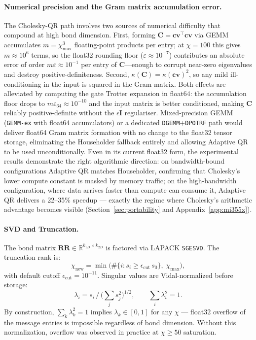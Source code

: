 \documentclass[11pt]{article}
\newcommand{\chimax}{\chi_{\mathrm{max}}}
\begin{document}
\paragraph{Numerical precision and the Gram matrix accumulation error.}
The Cholesky-QR path involves two sources of numerical difficulty that compound
at high bond dimension.
First, forming $\mathbf{C} = \mathbf{cv}^\top \mathbf{cv}$ via GEMM accumulates
$m = \chimax^3$ floating-point products per entry; at $\chi=100$ this gives
$m \approx 10^6$ terms, so the float32 rounding floor
($\varepsilon \approx 10^{-7}$) contributes an absolute error of order
$m\varepsilon \approx 10^{-1}$ per entry of $\mathbf{C}$---enough to corrupt
near-zero eigenvalues and destroy positive-definiteness.
Second, $\kappa(\mathbf{C}) = \kappa(\mathbf{cv})^2$, so any mild ill-conditioning
in the input is squared in the Gram matrix.
Both effects are alleviated by computing the gate Trotter expansion in float64:
the accumulation floor drops to $m\varepsilon_{64} \approx 10^{-10}$ and the
input matrix is better conditioned, making $\mathbf{C}$ reliably positive-definite
without the $\epsilon\mathbf{I}$ regulariser.
Mixed-precision GEMM (\texttt{GEMM-ex} with float64 accumulators) or a
dedicated \texttt{DGEMM}+\texttt{DPOTRF} path would deliver float64 Gram
matrix formation with no change to the float32 tensor storage, eliminating
the Householder fallback entirely and allowing Adaptive QR to be used
unconditionally.
Even in its current float32 form, the experimental results demonstrate the
right algorithmic direction: on bandwidth-bound configurations Adaptive QR
matches Householder, confirming that Cholesky's lower compute constant is
masked by memory traffic; on the high-bandwidth configuration, where data
arrives faster than compute can consume it, Adaptive QR delivers a 22--35\%
speedup --- exactly the regime where Cholesky's arithmetic advantage becomes
visible (Section~\ref{sec:portability} and Appendix~\ref{app:mi355x}).

\paragraph{SVD and Truncation.}
The bond matrix $\mathbf{RR} \in \mathbb{R}^{k_{1D} \times k_{2D}}$ is factored
via LAPACK \texttt{SGESVD}. The truncation rank is:
\begin{equation}
 \chi_{\text{new}} = \min\!\bigl(\#\{i : s_i \geq \epsilon_{\text{cut}}\, s_0\},\;
 \chimax\bigr),
 \label{eq:truncation}
\end{equation}
with default cutoff $\epsilon_{\text{cut}} = 10^{-11}$.
Singular values are Vidal-normalized before storage:
\begin{equation}
 \lambda_i = s_i \,/\, \bigl(\textstyle\sum_j s_j^2\bigr)^{1/2},
 \qquad \sum_i \lambda_i^2 = 1.
 \label{eq:vidal_norm}
\end{equation}
By construction, $\sum_k \lambda_k^2 = 1$ implies $\lambda_k \in [0,1]$ for
any $\chi$ — float32 overflow of the message entries is impossible regardless
of bond dimension. Without this normalization, overflow was observed in practice
at $\chi \geq 50$ saturation.
\end{document}
